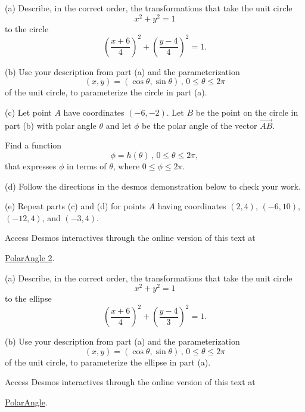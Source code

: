 \documentclass{ximera}
\begin{document}
\begin{question} \label{Qdfthjimk}
(a) Describe, in the correct order, the transformations that take the unit circle
\[
  x^2 +y^2 = 1
\]
to the circle
\[
  \left( \frac{x+6}{4} \right)^2 +  \left( \frac{y-4}{4} \right)^2 = 1 .
\]

(b) Use your description from part (a) and the parameterization
\[
   ( x, y)  = ( \cos \theta , \sin\theta)  \, , \, 0\leq \theta \leq 2\pi
\]
of the unit circle, to parameterize the circle in part (a). 

(c) Let point $A$ have coordinates $(-6,-2)$. Let $B$ be the point on the circle in part (b) with polar angle $\theta$ and let
$\phi$ be the polar angle of the vector $\overrightarrow{AB}$.

Find a function
\[
  \phi = h(\theta) \, , \, 0\leq \theta \leq 2\pi ,
\]
that expresses $\phi$ in terms of $\theta$, where $0\leq \phi \leq 2\pi$.

(d) Follow the directions in the desmos demonstration below to check your work.

(e) Repeat parts (c) and (d) for points $A$ having coordinates $(2,4)$, $(-6,10)$, $(-12,4)$, and $(-3,4)$.  


\begin{onlineOnly}
    \begin{center}
\end{center}
\end{onlineOnly}


Access Desmos interactives through the online version of this text at
 
\href{https://www.desmos.com/calculator/7wverptnzm}{PolarAngle 2}.

\end{question}




\begin{question} \label{Qetfg8uijjg}
(a) Describe, in the correct order, the transformations that take the unit circle
\[
  x^2 +y^2 = 1
\]
to the ellipse
\[
  \left( \frac{x+6}{4} \right)^2 + \left( \frac{y-4}{3} \right)^2 = 1.
\]

(b) Use your description from part (a) and the parameterization
\[
   ( x, y)  = ( \cos \theta , \sin\theta)  \, , \, 0\leq \theta \leq 2\pi
\]
of the unit circle, to parameterize the ellipse in part (a). 


 \begin{exploration}
\begin{onlineOnly}
    \begin{center}
\end{center}
\end{onlineOnly}


Access Desmos interactives through the online version of this text at
 
\href{https://www.desmos.com/calculator/balmyutbjj}{PolarAngle}.

\end{exploration}

\end{question}
\end{document}
